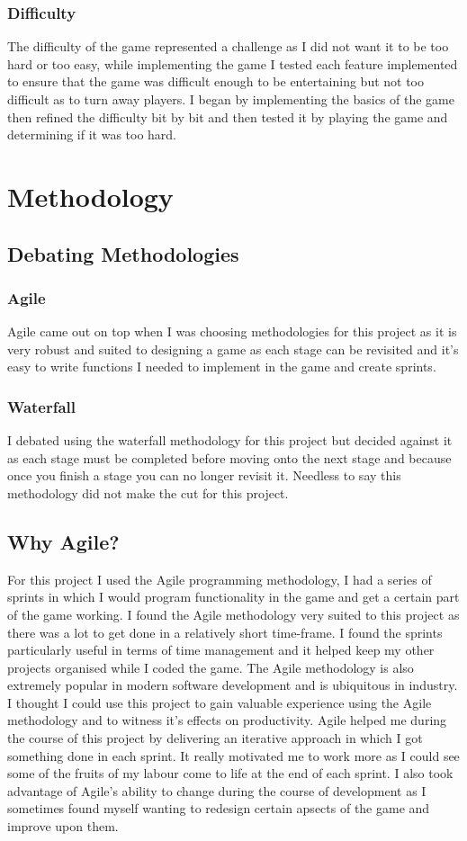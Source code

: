 \documentclass{report}
\begin{document}
\subsection{Difficulty}
The difficulty of the game represented a challenge as I did not want it to be too hard or too easy, while implementing the game I tested each feature implemented to ensure that the game was difficult enough to be entertaining but not too difficult as to turn away players.  I began by implementing the basics of the game then refined the difficulty bit by bit and then tested it by playing the game and determining if it was too hard.
\chapter{Methodology}
\section{Debating Methodologies}
\subsection{Agile}
Agile came out on top when I was choosing methodologies for this project as it is very robust and suited to designing a game as each stage can be revisited and it's easy to write functions I needed to implement in the game and create sprints.
\subsection{Waterfall}
I debated using the waterfall methodology for this project but decided against it as each stage must be completed before moving onto the next stage and because once you finish a stage you can no longer revisit it.  Needless to say this methodology did not make the cut for this project.
\section{Why Agile?}
For this project I used the Agile\cite{Agile} programming methodology, I had a series of sprints\cite{Sprint} in which I would program functionality in the game and get a certain part of the game working. I found the Agile methodology very suited to this project as there was a lot to get done in a relatively short time-frame.  I found the sprints particularly useful in terms of time management and it helped keep my other projects organised while I coded the game.  The Agile methodology is also extremely popular in modern software development and is ubiquitous in industry.  I thought I could use this project to gain valuable experience using the Agile methodology and to witness it's effects on productivity.  Agile helped me during the course of this project by delivering an iterative approach in which I got something done in each sprint.  It really motivated me to work more as I could see some of the fruits of my labour come to life at the end of each sprint.  I also took advantage of Agile's ability to change during the course of development as I sometimes found myself wanting to redesign certain apsects of the game and improve upon them.
\end{document}
